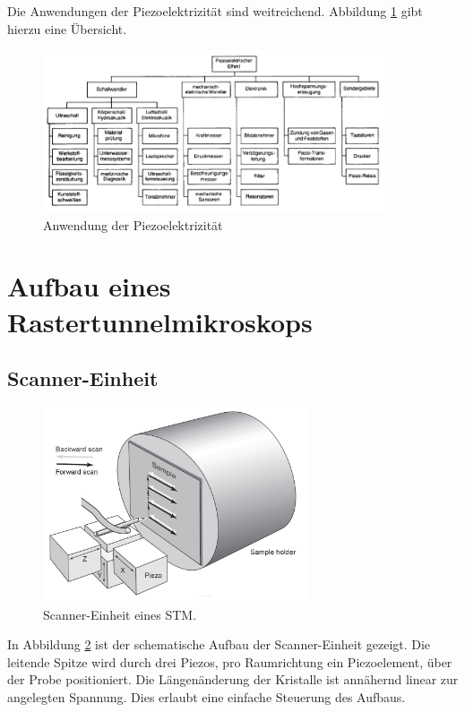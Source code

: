 Die Anwendungen der Piezoelektrizität sind weitreichend. Abbildung \ref{piezo_anw} 
gibt hierzu eine Übersicht. \cite{phying}
\begin{figure}[H]
    \centering
    \includegraphics[width=0.9\textwidth]{Abb/piezo_anw.png}
    \caption{Anwendung der Piezoelektrizität \cite{phying}}
    \label{piezo_anw}
\end{figure}

\section{Aufbau eines Rastertunnelmikroskops}
    \subsection{Scanner-Einheit}

\begin{figure}[h]
    \centering
    \includegraphics[width=0.7\textwidth]{Abb/scanner.png}
    \caption{Scanner-Einheit eines STM. \cite{nanosurf}}
    \label{scan}
\end{figure}
In Abbildung \ref{scan} ist der schematische Aufbau der Scanner-Einheit gezeigt.
Die leitende Spitze wird durch drei Piezos, pro Raumrichtung ein Piezoelement, 
über der Probe positioniert. Die Längenänderung der Kristalle ist annähernd linear
zur angelegten Spannung. Dies erlaubt eine einfache Steuerung des Aufbaus.

